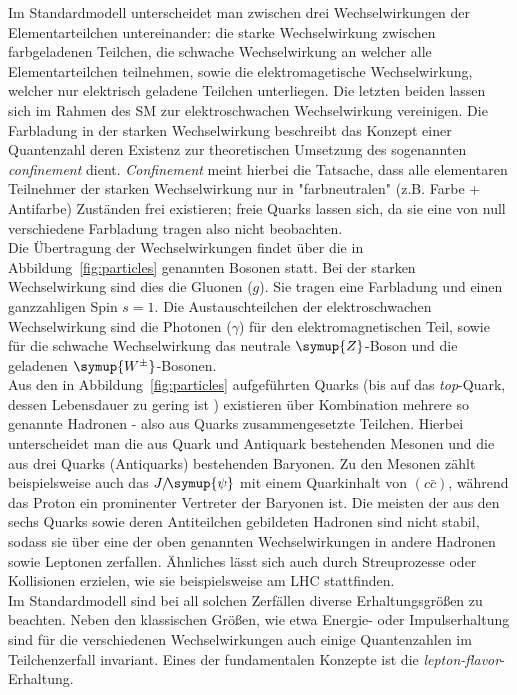 Im Standardmodell unterscheidet man zwischen drei Wechselwirkungen der Elementarteilchen untereinander: die starke Wechselwirkung zwischen farbgeladenen Teilchen, die schwache Wechselwirkung an welcher alle Elementarteilchen teilnehmen, sowie die elektromagetische Wechselwirkung, welcher nur elektrisch geladene Teilchen unterliegen. Die letzten beiden lassen sich im Rahmen des SM zur elektroschwachen Wechselwirkung vereinigen.
Die Farbladung in der starken Wechselwirkung beschreibt das Konzept einer Quantenzahl deren Existenz zur theoretischen Umsetzung des sogenannten \textit{confinement} dient. \textit{Confinement} meint hierbei die Tatsache, dass alle elementaren Teilnehmer der starken Wechselwirkung nur in "farbneutralen" (z.B. Farbe + Antifarbe) Zuständen frei existieren; freie Quarks lassen sich, da sie eine von null verschiedene Farbladung tragen also nicht beobachten.\\
%
Die Übertragung der Wechselwirkungen findet über die in Abbildung~\ref{fig:particles} genannten Bosonen statt. Bei der starken Wechselwirkung sind dies die Gluonen ($g$). Sie tragen eine Farbladung und einen ganzzahligen Spin $s=1$. Die Austauschteilchen der elektroschwachen Wechselwirkung sind die Photonen ($\gamma$) für den elektromagnetischen Teil, sowie für die schwache Wechselwirkung das neutrale $\symup{Z}$-Boson und die geladenen $\symup{W^{\pm}}$-Bosonen. \\
%
Aus den in Abbildung~\ref{fig:particles} aufgeführten Quarks (bis auf das \textit{top}-Quark, dessen Lebensdauer zu gering ist \cite{pdg}) existieren über Kombination mehrere so genannte Hadronen - also aus Quarks zusammengesetzte Teilchen. Hierbei unterscheidet man die aus Quark und Antiquark bestehenden Mesonen und die aus drei Quarks (Antiquarks) bestehenden Baryonen. Zu den Mesonen zählt beispielsweise auch das $J/\!\symup{\psi}$ mit einem Quarkinhalt von $(c\bar{c})$, während das Proton ein prominenter Vertreter der Baryonen ist. Die meisten der aus den sechs Quarks sowie deren Antiteilchen gebildeten Hadronen sind nicht stabil, sodass sie über eine der oben genannten Wechselwirkungen in andere Hadronen sowie Leptonen zerfallen. Ähnliches lässt sich auch durch Streuprozesse oder Kollisionen erzielen, wie sie beispielsweise am LHC stattfinden.\\
%
Im Standardmodell sind bei all solchen Zerfällen diverse Erhaltungsgrößen zu beachten. Neben den klassischen Größen, wie etwa Energie- oder Impulserhaltung sind für die verschiedenen Wechselwirkungen auch einige Quantenzahlen im Teilchenzerfall invariant. Eines der fundamentalen Konzepte ist die \textit{lepton-flavor}-Erhaltung.
%
